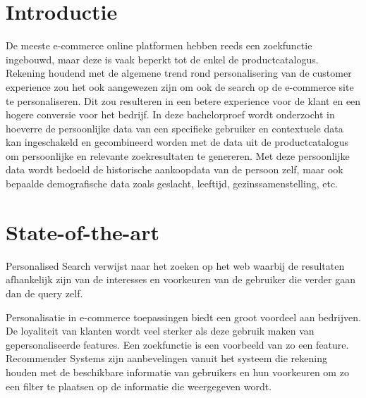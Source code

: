
\section{Introductie} %
\label{sec:introductie}

De meeste e-commerce online platformen hebben reeds een zoekfunctie ingebouwd, maar deze is vaak beperkt tot de  enkel de productcatalogus. Rekening houdend met de algemene trend rond personalisering van de customer experience zou het ook aangewezen zijn om ook de search op de e-commerce site te personaliseren. Dit zou resulteren in een betere experience voor de klant en een hogere conversie voor het bedrijf. In deze bachelorproef wordt onderzocht in hoeverre de persoonlijke data van een specifieke gebruiker en contextuele data kan ingeschakeld en gecombineerd worden met de data uit de productcatalogus om persoonlijke en relevante zoekresultaten te genereren. 
Met deze persoonlijke data wordt bedoeld de historische aankoopdata van de persoon zelf, maar ook bepaalde demografische data zoals geslacht, leeftijd, gezinssamenstelling, etc. 



\section{State-of-the-art}
\label{sec:state-of-the-art}

Personalised Search \autocite{Pitkow2002} verwijst naar het zoeken op het web waarbij de resultaten afhankelijk zijn van de interesses en voorkeuren van de gebruiker die verder gaan dan de query zelf. 

Personalisatie in e-commerce toepassingen biedt een groot voordeel aan bedrijven. De loyaliteit van klanten wordt veel sterker als deze gebruik maken van gepersonaliseerde features.\autocite{Telang2005} Een zoekfunctie is een voorbeeld van zo een feature.
Recommender Systems \autocite{Resnick1997} zijn aanbevelingen vanuit het systeem die rekening houden met de beschikbare informatie van gebruikers en hun voorkeuren om zo een filter te plaatsen op de informatie die weergegeven wordt. 

